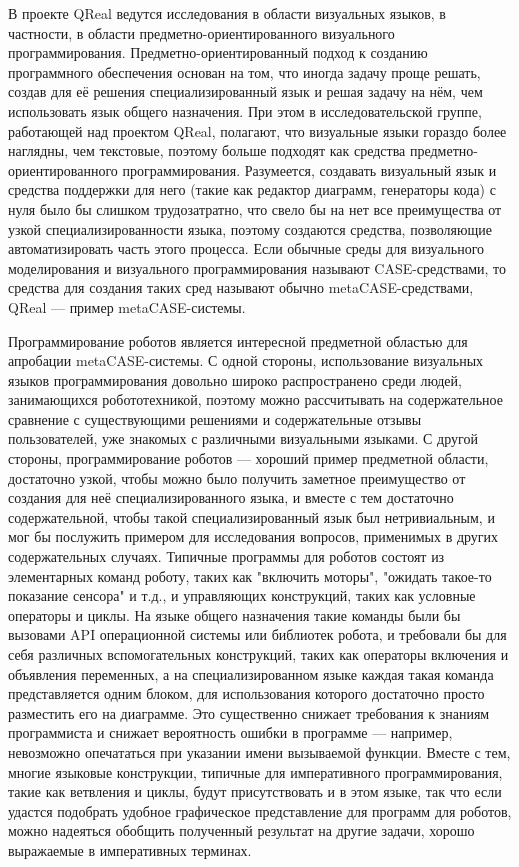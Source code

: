 \documentclass[a4paper]{article}
\begin{document}
В проекте QReal ведутся исследования в области визуальных языков, в частности, в области предметно-ориентированного визуального программирования. Предметно-ориентированный подход к созданию программного обеспечения основан на том, что иногда задачу проще решать, создав для её решения специализированный язык и решая задачу на нём, чем использовать язык общего назначения. При этом в исследовательской группе, работающей над проектом QReal, полагают, что визуальные языки гораздо более наглядны, чем текстовые, поэтому больше подходят как средства предметно-ориентированного программирования. Разумеется, создавать визуальный язык и средства поддержки для него (такие как редактор диаграмм, генераторы кода) с нуля было бы слишком трудозатратно, что свело бы на нет все преимущества от узкой специализированности языка, поэтому создаются средства, позволяющие автоматизировать часть этого процесса. Если обычные среды для визуального моделирования и визуального программирования называют CASE-средствами, то средства для создания таких сред называют обычно metaCASE-средствами, QReal --- пример metaCASE-системы.

Программирование роботов является интересной предметной областью для апробации metaCASE-системы. С одной стороны, использование визуальных языков программирования довольно широко распространено среди людей, занимающихся робототехникой, поэтому можно рассчитывать на содержательное сравнение с существующими решениями и содержательные отзывы пользователей, уже знакомых с различными визуальными языками. С другой стороны, программирование роботов --- хороший пример предметной области, достаточно узкой, чтобы можно было получить заметное преимущество от создания для неё специализированного языка, и вместе с тем достаточно содержательной, чтобы такой специализированный язык был нетривиальным, и мог бы послужить примером для исследования вопросов, применимых в других содержательных случаях. Типичные программы для роботов состоят из элементарных команд роботу, таких как "включить моторы", "ожидать такое-то показание сенсора" и т.д., и управляющих конструкций, таких как условные операторы и циклы. На языке общего назначения такие команды были бы вызовами API операционной системы или библиотек робота, и требовали бы для себя различных вспомогательных конструкций, таких как операторы включения и объявления переменных, а на специализированном языке каждая такая команда представляется одним блоком, для использования которого достаточно просто разместить его на диаграмме. Это существенно снижает требования к знаниям программиста и снижает вероятность ошибки в программе --- например, невозможно опечататься при указании имени вызываемой функции. Вместе с тем, многие языковые конструкции, типичные для императивного программирования, такие как ветвления и циклы, будут присутствовать и в этом языке, так что если удастся подобрать удобное графическое представление для программ для роботов, можно надеяться обобщить полученный результат на другие задачи, хорошо выражаемые в императивных терминах.
\end{document}
